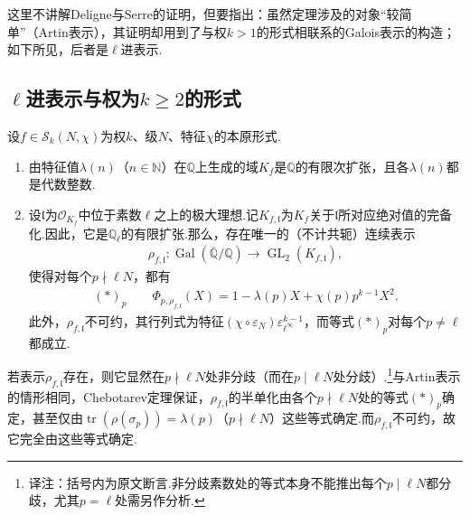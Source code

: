 这里不讲解Deligne与Serre的证明，但要指出：虽然定理涉及的对象``较简单''（Artin表示），其证明却用到了与权$k>1$的形式相联系的Galois表示的构造；如下所见，后者是$\ell$进表示.



\subsection{$\ell$进表示与权为$k\geqslant2$的形式}\label{sec:modular-2-1-3}

\begin{theorem*}

设$f\in\mathcal S_k(N,\chi)$为权$k$、级$N$、特征$\chi$的本原形式.

\begin{enumerate}[label=\roman*)]

\item 由特征值$\lambda(n)$（$n\in\mathbb N$）在$\mathbb Q$上生成的域$K_f$是$\mathbb Q$的有限次扩张，且各$\lambda(n)$都是代数整数.

\item 设$\mathfrak l$为$\mathcal O_{K_f}$中位于素数$\ell$之上的极大理想.记$K_{f,\mathfrak l}$为$K_f$关于$\mathfrak l$所对应绝对值的完备化.因此，它是$\mathbb Q_\ell$的有限扩张.那么，存在唯一的（不计共轭）连续表示
\begin{align*}
\rho_{f,\mathfrak l}:\operatorname{Gal}(\overline{\mathbb Q}/\mathbb Q)\longrightarrow\operatorname{GL}_2(K_{f,\mathfrak l}),
\end{align*}
使得对每个$p\nmid\ell N$，都有
\begin{align*}
(*)_p\qquad\Phi_{p,\rho_{f,\mathfrak l}}(X)=1-\lambda(p)X+\chi(p)p^{k-1}X^2.
\end{align*}
此外，$\rho_{f,\mathfrak l}$不可约，其行列式为特征$(\chi\circ\varepsilon_N)\varepsilon_{\ell^\infty}^{k-1}$，而等式$(*)_p$对每个$p\ne\ell$都成立.

\end{enumerate}

\end{theorem*}

\begin{remark*}[关于唯一性]

若表示$\rho_{f,\mathfrak l}$存在，则它显然在$p\nmid\ell N$处非分歧（而在$p\mid\ell N$处分歧）.\footnote{译注：括号内为原文断言.非分歧素数处的等式本身不能推出每个$p\mid\ell N$都分歧，尤其$p=\ell$处需另作分析.}与Artin表示的情形相同，Chebotarev定理保证，$\rho_{f,\mathfrak l}$的半单化由各个$p\nmid\ell N$处的等式$(*)_p$确定，甚至仅由$\operatorname{tr}(\rho(\sigma_p))=\lambda(p)$（$p\nmid\ell N$）这些等式确定.而$\rho_{f,\mathfrak l}$不可约，故它完全由这些等式确定.

\end{remark*}

